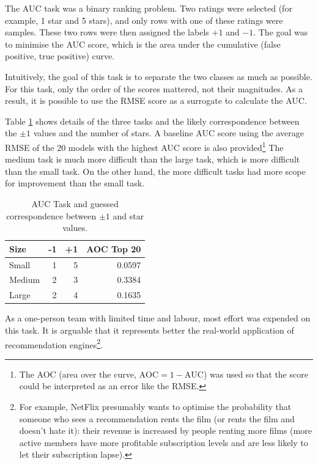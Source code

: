 \documentclass{article}
\begin{document}
The AUC task was a binary ranking problem.  Two ratings were selected (for example, 1 star and 5 stars), and only rows with one of these ratings were samples.  These two rows were then assigned the labels $+1$ and $-1$.  The goal was to minimise the AUC score, which is the area under the cumulative (false positive, true positive) curve.

Intuitively, the goal of this task is to separate the two classes as much as possible.  For this task, only the order of the scores mattered, not their magnitudes.  As a result, it is possible to use the RMSE score as a surrogate to calculate the AUC.

Table \ref{auc} shows details of the three tasks and the likely correspondence between the $\pm 1$ values and the number of stars.  A baseline AUC score using the average RMSE of the 20 models with the highest AUC score is also provided\footnote{The AOC (area over the curve, $\mathrm{AOC} = 1 - \mathrm{AUC}$) was used so that the score could be interpreted as an error like the RMSE.}
The medium task is much more difficult than the large task, which is more difficult than the small task.  On the other hand, the more difficult tasks had more scope for improvement than the small task.

\begin{table}[t]
\caption{AUC Task and guessed correspondence between $\pm 1$ and star values.}
\label{auc}
\vskip 0.15in
\begin{center}
\begin{small}
\begin{sc}
\begin{tabular}{lrrr}
\hline
\abovespace\belowspace
Size & -1 & +1 & AOC Top 20 \\
\hline
\abovespace
Small    & 1 & 5 & 0.0597 \\
Medium   & 2 & 3 & 0.3384 \\
\belowspace
Large    & 2 & 4 & 0.1635 \\
\hline
\end{tabular}
\end{sc}
\end{small}
\end{center}
\vskip -0.1in
\end{table}

As a one-person team with limited time and labour, most effort was expended on this task.  It is arguable that it represents better the real-world application of recommendation engines\footnote{For example, NetFlix presumably wants to optimise the probability that someone who sees a recommendation rents the film (or rents the film and doesn't hate it): their revenue is increased by people renting more films (more active members have more profitable subscription levels and are less likely to let their subscription lapse).}.
\end{document}
